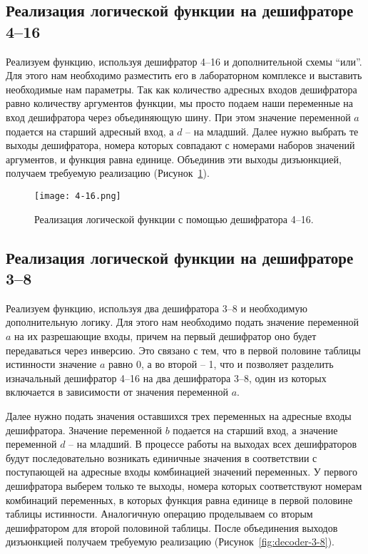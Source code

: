 \documentclass[a4paper]{article}
\begin{document}
    \subsection{Реализация логической функции на дешифраторе 4--16}\label{subsec:decoder-4-16}
    Реализуем функцию, используя дешифратор 4--16 и дополнительной схемы “или”.
    Для этого нам необходимо разместить его в лабораторном комплексе и выставить необходимые нам параметры.
    Так как количество адресных входов дешифратора равно количеству аргументов функции,
    мы просто подаем наши переменные на вход дешифратора через объединяющую шину.
    При этом значение переменной $ a $ подается на старший адресный вход, а $ d $ – на младший.
    Далее нужно выбрать те выходы дешифратора, номера которых совпадают с номерами наборов значений аргументов,
    и функция равна единице.
    Объединив эти выходы дизъюнкцией, получаем требуемую реализацию (Рисунок~\ref{fig:decoder-4-16}).

    \begin{figure}[h]
        \centering
        \texttt{[image: 4-16.png]}
        \caption{\centering Реализация логической функции с помощью дешифратора 4--16.}\label{fig:decoder-4-16}

    \end{figure}

    \subsection{Реализация логической функции на дешифраторе 3--8}\label{subsec:decoder-3-8}
    Реализуем функцию, используя два дешифратора 3--8 и необходимую дополнительную логику.
    Для этого нам необходимо подать значение переменной $ a $ на их разрешающие входы,
    причем на первый дешифратор оно будет передаваться через инверсию.
    Это связано с тем, что в первой половине таблицы истинности значение $ a $ равно 0,
    а во второй – 1, что и позволяет разделить изначальный дешифратор 4--16 на два дешифратора 3--8,
    один из которых включается в зависимости от значения переменной $ a $.

    Далее нужно подать значения оставшихся трех переменных на адресные входы дешифратора.
    Значение переменной $ b $ подается на старший вход, а значение переменной $ d $ – на младший.
    В процессе работы на выходах всех дешифраторов будут последовательно возникать единичные значения
    в соответствии с поступающей на адресные входы комбинацией значений переменных.
    У первого дешифратора выберем только те выходы, номера которых соответствуют номерам комбинаций переменных,
    в которых функция равна единице в первой половине таблицы истинности.
    Аналогичную операцию проделываем со вторым дешифратором для второй половиной таблицы.
    После объединения выходов дизъюнкцией получаем требуемую реализацию (Рисунок~\ref{fig:decoder-3-8}).
\end{document}
